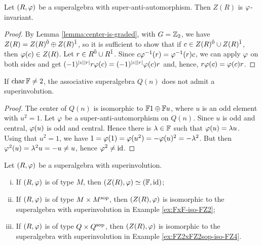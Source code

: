 \begin{lemma}
    Let $(R, \varphi)$ be a superalgebra with super-anti-automorphism. 
    Then $Z(R)$ is $\varphi$-invariant.
\end{lemma}

\begin{proof}
    By Lemma \ref{lemma:center-is-graded}, with $G = \mathbb{Z}_2$, we have $Z(R) = Z(R)^{\bar0} \oplus Z(R)^{\bar1}$, so it is sufficient to show that if $c \in Z(R)^{\bar0} \cup Z(R)^{\bar1}$, then $\varphi(c) \in Z(R)$.
    Let $r \in R^{\bar0} \cup R^{\bar1}$. 
    Since $c\varphi^{-1} (r) = \varphi^{-1} (r)c$, we can apply $\varphi$ on both sides and get $(-1)^{|c||r|} r \varphi(c) = (-1)^{|c||r|} \varphi(c) r$ and, hence, $r \varphi(c) = \varphi(c) r$.
\end{proof}

\begin{cor}\label{cor:Q-no-spuerinv-center}
    If $\operatorname{char} \mathbb{F} \neq 2$, the associative superalgebra $Q(n)$ does not admit a superinvolution.
\end{cor}

\begin{proof}
    The center of $Q(n)$ is isomorphic to $\mathbb{F}1 \oplus \mathbb{F} u$, where $u$ is an odd element with $u^2 = 1$. 
    Let $\varphi$ be a super-anti-automorphism on $Q(n)$. 
    Since $u$ is odd and central, $\varphi(u)$ is odd and central. 
    Hence there is $\lambda \in \mathbb{F}$ such that $\varphi(u) = \lambda u$. 
    Using that $u^2 = 1$, we have $1 = \varphi(1) = \varphi(u^2) = - \varphi(u)^2 = - \lambda^2$. 
    But then $\varphi^2 (u) = \lambda^2 u = -u \neq u$, hence $\varphi^2 \neq \operatorname{id}$. 
\end{proof}


\begin{prop}\label{prop:types-of-SA-via-center}
    Let $(R, \varphi)$ be a superalgebra with superinvolution.
    \begin{enumerate}[(i)]
        \item If $(R, \varphi)$ is of type $M$, then $(Z(R), \varphi) \simeq (\mathbb{F}, \operatorname{id})$;\label{item:F-id}
        \item If $(R, \varphi)$ is of type $M\times M^{\mathrm{sop}}$, then $(Z(R), \varphi)$ is isomorphic to the superalgebra with superinvolution in Example \ref{ex:FxF-iso-FZ2};\label{item:FZ2-exchg}
        \item If $(R, \varphi)$ is of type $Q\times Q^{\mathrm{sop}}$, then $(Z(R), \varphi)$ is isomorphic to the superalgebra with superinvolution in Example \ref{ex:FZ2xFZ2sop-iso-FZ4}.\label{item:FZ4-exchg}
    \end{enumerate}
\end{prop}

